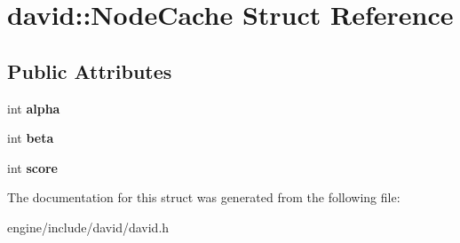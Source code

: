 \hypertarget{structdavid_1_1NodeCache}{}\section{david\+:\+:Node\+Cache Struct Reference}
\label{structdavid_1_1NodeCache}
\subsection*{Public Attributes}
\begin{DoxyCompactItemize}
\item 
\mbox{\label{structdavid_1_1NodeCache_a9629752286e811bb9ef199e2ba5f4bdd}} 
int {\bfseries alpha}
\item 
\mbox{\label{structdavid_1_1NodeCache_a15682f8caf711845e78858670c7c1237}} 
int {\bfseries beta}
\item 
\mbox{\label{structdavid_1_1NodeCache_a7ffd614d9d0d8a778dc807c0bea81444}} 
int {\bfseries score}
\end{DoxyCompactItemize}


The documentation for this struct was generated from the following file\+:\begin{DoxyCompactItemize}
\item 
engine/include/david/david.\+h\end{DoxyCompactItemize}
